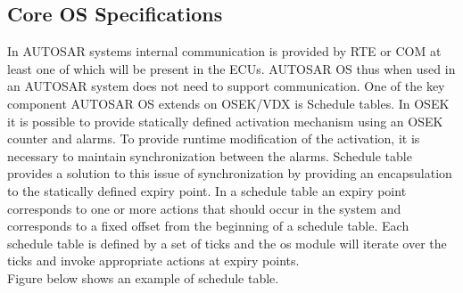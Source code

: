 \subsection{Core OS Specifications}
In AUTOSAR systems internal communication is provided by RTE or COM at least one of which will be present in the ECUs.
AUTOSAR OS thus when used in an AUTOSAR system does not need to support communication.
One of the key component AUTOSAR OS extends on OSEK/VDX is Schedule tables.
In OSEK it is possible to provide statically defined activation mechanism using an OSEK counter and alarms. To provide runtime modification of the activation, it is necessary to maintain synchronization between the alarms.
Schedule table provides a solution to this issue of synchronization by providing an encapsulation to the statically defined expiry point.
In a schedule table an expiry point corresponds to one or more actions that should occur in the system and corresponds to a fixed offset from the beginning of a schedule table.
Each schedule table is defined by a set of ticks and the os module will iterate over the ticks and invoke appropriate actions at expiry points. \\Figure below shows an example of schedule table.\\
\noindent%
\begin{minipage}{\linewidth}%
\end{minipage}


 

